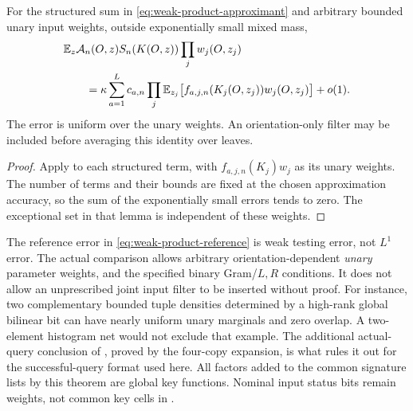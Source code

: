 \begin{corollary}
\label{cor:weak-product-factorized-integration}
For the structured sum in \eqref{eq:weak-product-approximant} and
arbitrary bounded unary input weights, outside exponentially small
mixed mass,
\begin{align}\label{eq:weak-product-factorized-integration}
 &\mathbb E_z\mathcal A_n(O,z)S_n(K(O,z))\prod_jw_j(O,z_j)\notag\\
 &\qquad=
 \kappa\sum_{a=1}^{L}c_{a,n}
       \prod_j\mathbb E_{z_j}
        \bigl[f_{a,j,n}(K_j(O,z_j))w_j(O,z_j)\bigr]+o(1).
\end{align}
The error is uniform over the unary weights. An orientation-only
filter may be included before averaging this identity over leaves.
\end{corollary}

\begin{proof}
Apply  to each structured term, with
$f_{a,j,n}(K_j)w_j$ as its unary weights. The number of terms and
their bounds are fixed at the chosen approximation accuracy, so the
sum of the exponentially small errors tends to zero. The exceptional
set in that lemma is independent of these weights.
\end{proof}

\begin{remark}
\label{rem:weak-product-filter-class}
The reference error in \eqref{eq:weak-product-reference} is weak
testing error, not $L^1$ error. The actual comparison allows arbitrary
orientation-dependent \emph{unary} parameter weights, and the
specified binary Gram/$L,R$ conditions. It does not allow an
unprescribed joint input filter to be inserted without proof.
For instance, two complementary bounded tuple densities determined
by a high-rank global bilinear bit can have nearly uniform unary
marginals and zero overlap. A two-element histogram net would not
exclude that example. The additional actual-query conclusion of
, proved by the four-copy expansion, is what
rules it out for the successful-query format used here. All factors
added to the common signature lists by this theorem are global key
functions. Nominal input status bits remain weights, not common key
cells in .
\end{remark}
